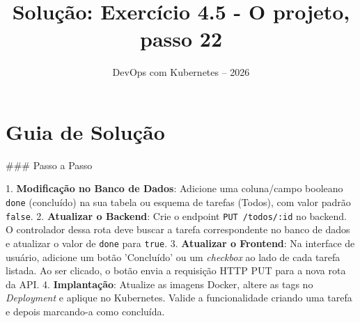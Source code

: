 \documentclass[11pt,a4paper]{article}
\title{\color{secondary}\Huge\textbf{Solução: Exercício 4.5 - O projeto, passo 22}}
\author{\color{primary}DevOps com Kubernetes -- 2026}
\date{}
\begin{document}
\maketitle

\section*{\color{primary}Guia de Solução}
\begin{tcolorbox}[colback=green!5!white,colframe=green!60!black,title=Resolução Passo a Passo]
### Passo a Passo

1. \textbf{Modificação no Banco de Dados}: Adicione uma coluna/campo booleano \texttt{done} (concluído) na sua tabela ou esquema de tarefas (Todos), com valor padrão \texttt{false}.
2. \textbf{Atualizar o Backend}: Crie o endpoint \texttt{PUT /todos/:id} no backend. O controlador dessa rota deve buscar a tarefa correspondente no banco de dados e atualizar o valor de \texttt{done} para \texttt{true}.
3. \textbf{Atualizar o Frontend}: Na interface de usuário, adicione um botão 'Concluído' ou um \textit{checkbox} ao lado de cada tarefa listada. Ao ser clicado, o botão envia a requisição HTTP PUT para a nova rota da API.
4. \textbf{Implantação}: Atualize as imagens Docker, altere as tags no \textit{Deployment} e aplique no Kubernetes. Valide a funcionalidade criando uma tarefa e depois marcando-a como concluída.
\end{tcolorbox}
\end{document}
